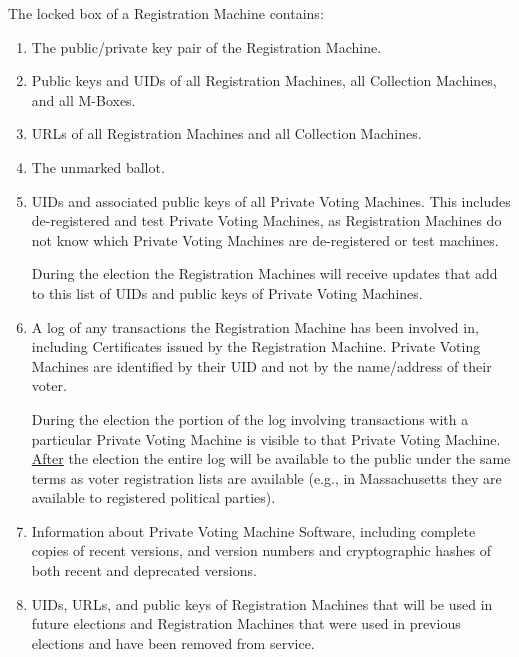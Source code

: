 \documentclass[12pt]{article}
\begin{document}
The locked box of a Registration Machine contains:
\begin{enumerate}
\item The public/private key pair of the Registration Machine.
\item Public keys and UIDs of all Registration Machines, all Collection
Machines, and all M-Boxes.
\item URLs of all Registration Machines and all Collection Machines.
\item The unmarked ballot.
\item UIDs and associated public keys of all Private Voting
Machines.  This includes de-registered and test Private Voting
Machines, as Registration Machines do not know which Private Voting
Machines are de-registered or test machines.

During the election the Registration Machines will receive updates
that add to this list of UIDs and public keys of Private Voting
Machines.
\item A log of any transactions the Registration Machine has
been involved in, including  Certificates issued by the Registration Machine.
Private Voting Machines are identified by their UID and not by the
name/address of their voter.

During the election the portion of the log involving transactions with
a particular Private Voting Machine is visible to that Private Voting
Machine.  \underline{After} the election the entire log will be available
to the public under the same terms as voter registration lists are
available (e.g., in Massachusetts they are available to registered
political parties).
\item Information about Private Voting Machine Software, including
complete copies of recent versions, and version numbers and
cryptographic hashes of both recent and deprecated versions.
\item UIDs, URLs, and public keys of Registration Machines that will be used
in future elections and Registration Machines that were used in previous
elections and have been removed from service.
\end{enumerate}
\end{document}
